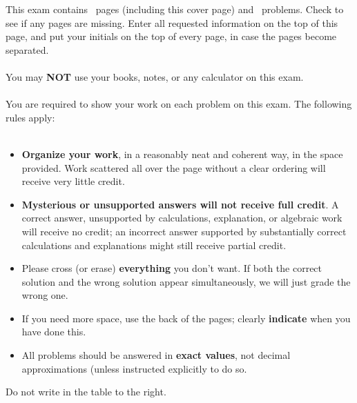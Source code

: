 \documentclass[11pt]{exam}%
\begin{document}
This exam contains \numpages\ pages (including this cover page) and \numquestions\ problems.  Check to see if any pages are missing.  Enter all requested information on the top of this page, and put your initials on the top of every page, in case the pages become separated.\\
\\
You may \textbf{NOT} use your books, notes, or any calculator on this exam.\\
\\
You are required to show your work on each problem on this exam.  The following rules apply:\\
\\
%
\begin{minipage}[t]{3.7in}%
\vspace{0pt}%
\begin{itemize}%
\item%

\textbf{Organize your work}, in a reasonably neat and coherent way, in the space provided. Work scattered all over the page without a clear ordering will receive very little credit.
%
\item%

\textbf{Mysterious or unsupported answers will not receive full credit}. A correct answer, unsupported by calculations, explanation, or algebraic work will receive no credit; an incorrect answer supported by substantially correct calculations and explanations might still receive partial credit.
%
\item%

Please cross (or erase) \textbf{everything} you don't want. If both the correct solution and the wrong solution appear simultaneously, we will just grade the wrong one.
%
\item%

If you need more space, use the back of the pages; clearly \textbf{indicate} when you have done this.
%
\item%

All problems should be answered in \textbf{exact values}, not decimal approximations (unless instructed explicitly to do so.%
\end{itemize}%
Do not write in the table to the right.%
\end{minipage}%
\hfill%
\begin{minipage}[t]{2.3in}%
\vspace{0pt}%
%
%
\addpoints%
\gradetable[v]%
\end{minipage}%
\end{document}
